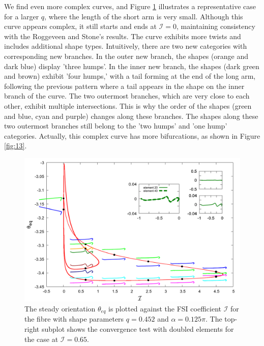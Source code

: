 \documentclass[lineno]{JFM-FLM_Au}
\begin{document}
We find even more complex curves, and Figure \ref{fig:12} illustrates a representative case for a larger $q$, where the length of the short arm is very small. Although this curve appears complex, it still starts and ends at $\mathcal{I}=0$, maintaining consistency with the Roggeveen and Stone's results. The curve exhibits more twists and includes additional shape types. Intuitively, there are two new categories with corresponding new branches. In the outer new branch, the shapes (orange and dark blue) display 'three humps'. In the inner new branch, the shapes (dark green and brown) exhibit 'four humps,' with a tail forming at the end of the long arm, following the previous pattern where a tail appears in the shape on the inner branch of the curve. The two outermost branches, which are very close to each other, exhibit multiple intersections. This is why the order of the shapes (green and blue, cyan and purple) changes along these branches. The shapes along these two outermost branches still belong to the 'two humps' and 'one hump' categories. Actually, this complex curve has more bifurcations, as shown in Figure \ref{fig:13}.
\begin{figure}[!h]
	\begin{center}
		\includegraphics[width=1\textwidth]{plot/combine_elastic_beam_I_theta_q_0.452_alpha_0.125pi_initial_-4.80_0.png}
		\caption{The steady orientation $\theta_{eq}$ is plotted against the FSI coefficient $\mathcal{I}$ for the fibre with shape parameters $q = 0.452$ and $\alpha = 0.125\pi$. The top-right subplot shows the convergence test with doubled elements for the case at $\mathcal{I}=0.65$.}
		\label{fig:12}
	\end{center}
\end{figure}
\end{document}
